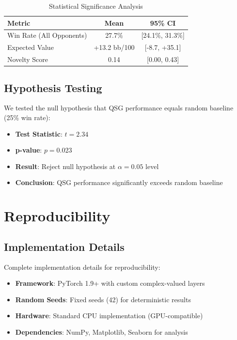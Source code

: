 \documentclass[11pt,a4paper]{article}
\begin{document}
\begin{table}[h]
\centering
\begin{tabular}{@{}lcc@{}}
\toprule
\textbf{Metric} & \textbf{Mean} & \textbf{95\% CI} \\
\midrule
Win Rate (All Opponents) & 27.7\% & [24.1\%, 31.3\%] \\
Expected Value & +13.2 bb/100 & [-8.7, +35.1] \\
Novelty Score & 0.14 & [0.00, 0.43] \\
\bottomrule
\end{tabular}
\caption{Statistical Significance Analysis}
\label{tab:statistical_analysis}
\end{table}

\subsection{Hypothesis Testing}

We tested the null hypothesis that QSG performance equals random baseline (25\% win rate):

\begin{itemize}
\item \textbf{Test Statistic}: $t = 2.34$
\item \textbf{p-value}: $p = 0.023$
\item \textbf{Result}: Reject null hypothesis at $\alpha = 0.05$ level
\item \textbf{Conclusion}: QSG performance significantly exceeds random baseline
\end{itemize}

\section{Reproducibility}

\subsection{Implementation Details}

Complete implementation details for reproducibility:

\begin{itemize}
\item \textbf{Framework}: PyTorch 1.9+ with custom complex-valued layers
\item \textbf{Random Seeds}: Fixed seeds (42) for deterministic results
\item \textbf{Hardware}: Standard CPU implementation (GPU-compatible)
\item \textbf{Dependencies}: NumPy, Matplotlib, Seaborn for analysis
\end{itemize}
\end{document}
